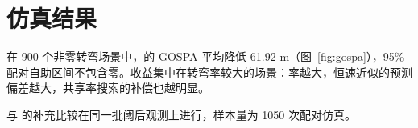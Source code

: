 \section{仿真结果}
在 900 个非零转弯场景中，\method 的 GOSPA 平均降低 61.92 m（图~\ref{fig:gospa}），95\% 配对自助区间不包含零。收益集中在转弯率较大的场景：率越大，恒速近似的预测偏差越大，共享率搜索的补偿也越明显。

与 \gtmethod 的补充比较在同一批阈后观测上进行，样本量为 1050 次配对仿真。
